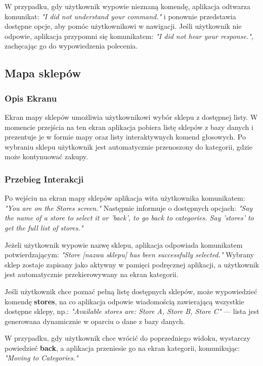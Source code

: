 W przypadku, gdy użytkownik wypowie nieznaną komendę, aplikacja odtwarza komunikat: \textit{"I did not understand your command."} i ponownie przedstawia dostępne opcje, aby pomóc użytkownikowi w nawigacji. Jeśli użytkownik nie odpowie, aplikacja przypomni się komunikatem: \textit{"I did not hear your response."}, zachęcając go do wypowiedzenia polecenia.


\subsection{Mapa sklepów}

\subsubsection{Opis Ekranu}
Ekran mapy sklepów umożliwia użytkownikowi wybór sklepu z dostępnej listy. W momencie przejścia na ten ekran aplikacja pobiera listę sklepów z bazy danych i prezentuje je w formie mapy oraz listy interaktywnych komend głosowych. Po wybraniu sklepu użytkownik jest automatycznie przenoszony do kategorii, gdzie może kontynuować zakupy.

\subsubsection{Przebieg Interakcji}
Po wejściu na ekran mapy sklepów aplikacja wita użytkownika komunikatem: \textit{"You are on the Stores screen."} Następnie informuje o dostępnych opcjach: \textit{"Say the name of a store to select it or 'back', to go back to categories. Say 'stores' to get the full list of stores."}

Jeżeli użytkownik wypowie nazwę sklepu, aplikacja odpowiada komunikatem potwierdzającym: \textit{"Store [nazwa sklepu] has been successfully selected."} Wybrany sklep zostaje zapisany jako aktywny w pamięci podręcznej aplikacji, a użytkownik jest automatycznie przekierowywany na ekran kategorii.

Jeśli użytkownik chce poznać pełną listę dostępnych sklepów, może wypowiedzieć komendę \textbf{stores}, na co aplikacja odpowie wiadomością zawierającą wszystkie dostępne sklepy, np.: \textit{"Available stores are: Store A, Store B, Store C"} — lista jest generowana dynamicznie w oparciu o dane z bazy danych.

W przypadku, gdy użytkownik chce wrócić do poprzedniego widoku, wystarczy powiedzieć \textbf{back}, a aplikacja przeniesie go na ekran kategorii, komunikując: \textit{"Moving to Categories."}

